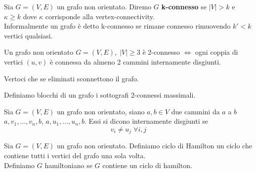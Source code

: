 \begin{definizione}
    Sia \(G=(V,E)\) un grafo non orientato. Diremo \(G\) \textbf{k-connesso} se \(|V|>k\) e \(\kappa \geq k\) dove \(\kappa\) corrisponde alla vertex-connectivity.\\
    Informalmente un grafo è detto k-connesso se rimane connesso rimuovendo \(k'<k\) vertici qualsiasi.
\end{definizione}

\begin{teorema}
    Un grafo non orientato \(G=(V,E),\; |V| \geq 3\) è 2-connesso \(\Leftrightarrow\) ogni coppia di vertici \((u,v)\) è connessa da almeno 2 cammini internamente disgiunti.
\end{teorema}

\begin{definizione}
    Vertoci che se eliminati sconnettono il grafo.
\end{definizione}

\begin{definizione}[Blocco]
    Definiamo blocchi di un grafo i sottografi 2-connessi massimali.
\end{definizione}

\begin{definizione}
    Sia \(G=(V,E)\) un grafo non orientato, siano \(a,b \in V\) due cammini da \(a\) a \(b\) \(a,v_1,\dots,v_n,b\), \(a,u_1,\dots,u_n,b\). Essi si dicono internamente disgiunti se
    \begin{equation}
        v_i \neq u_j\; \forall i,j
    \end{equation}
\end{definizione}

\begin{definizione}
    Sia \(G=(V,E)\) un grafo non orientato. Definiamo ciclo di Hamilton un ciclo che contiene tutti i vertici del grafo una sola volta.\\
    Definiamo \(G\) hamiltoniano se \(G\) contiene un ciclo di hamilton.
\end{definizione}

